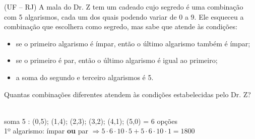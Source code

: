 \begin{ex}
(UF – RJ) A mala do Dr. Z tem um cadeado cujo segredo é uma combinação com 5 algarismos, cada um dos quais podendo variar de 0 a 9. Ele esqueceu a combinação que escolhera como segredo, mas sabe que atende às condições:
   \begin{itemize}
   \item	se o primeiro algarismo é ímpar, então o último algarismo também é ímpar;
   \item 	se o primeiro é par, então o último algarismo é igual ao primeiro;
   \item 	a soma do segundo e terceiro algarismos é 5.
   \end{itemize}

Quantas combinações diferentes atendem às condições estabelecidas pelo Dr. Z?
 \begin{sol}
   \phantom{A} \\
   soma 5 : (0,5); (1,4); (2,3); (3,2); (4,1); (5,0) = 6 opções \\
   1º algarismo: ímpar \textbf{ou} par 
   $\Longrightarrow 5\cdot6\cdot10\cdot5 + 5\cdot6\cdot10\cdot1=1800$
   
 \end{sol}
\end{ex}